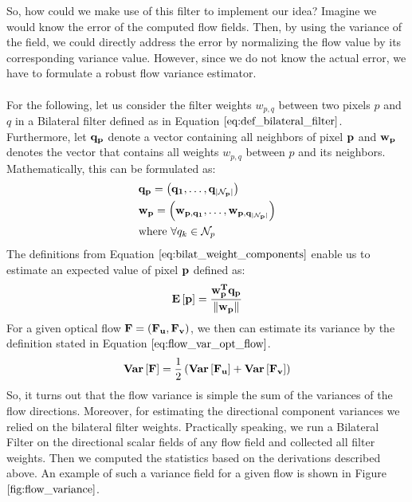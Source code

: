 So, how could we make use of this filter to implement our idea? Imagine we would know the error of the computed flow fields. Then, by using the variance of the field, we could directly address the error by normalizing the flow value by its corresponding variance value. However, since we do not know the actual error, we have to formulate a robust flow variance estimator. \\ \\
For the following, let us consider the filter weights $w_{p,q}$ between two pixels $p$ and $q$ in a Bilateral filter defined as in Equation $\ref{eq:def_bilateral_filter}$. Furthermore, let $\bf{q}_p$ denote a vector containing all neighbors of pixel $\bf{p}$ and $\bf{w}_p$ denotes the vector that contains all weights $w_{p,q}$ between $p$ and its neighbors. Mathematically, this can be formulated as:
\begin{equation}
\begin{aligned}
& \bf{q_p} = \left( q_1, \dots, q_{|\mathcal{N}_p|} \right) \\
& \bf{w_p} = \left( w_{p, q_1}, \dots, w_{p, q_{|\mathcal{N}_p|}} \right) \\
& \text{where } \forall q_k \in \mathcal{N}_p
\end{aligned}
\label{eq:bilat_weight_components}
\end{equation}
The definitions from Equation $\ref{eq:bilat_weight_components}$ enable us to estimate an expected value of pixel $\bf{p}$ defined as:
\begin{equation}
	\mathbf{E} \left[ \bf{p} \right] = \frac{\bf{w}_{p}^{T} \bf{q}_p}{\left\lVert\bf{w}_{p}\right\rVert}
\end{equation}
For a given optical flow $\bf{F} = (\bf{F_u}, \bf{F_v})$, we then can estimate its variance by the definition stated in Equation $\ref{eq:flow_var_opt_flow}$.
\begin{equation}
	\mathbf{Var} \left[ \bf{F} \right] = \frac{1}{2} \left( \mathbf{Var} \left[ \bf{F_u} \right] + \mathbf{Var} \left[ \bf{F_v} \right] \right)
\label{eq:flow_var_opt_flow}	
\end{equation}
So, it turns out that the flow variance is simple the sum of the variances of the flow directions. Moreover, for estimating the directional component variances we relied on the bilateral filter weights. Practically speaking, we run a Bilateral Filter on the directional scalar fields of any flow field and collected all filter weights. Then we computed the statistics based on the derivations described above. An example of such a variance field for a given flow is shown in Figure $\ref{fig:flow_variance}$.
